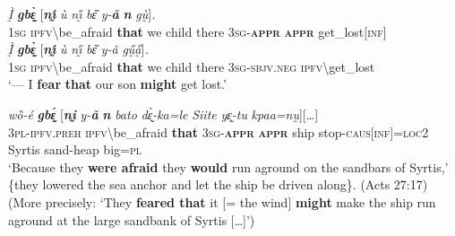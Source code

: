 \documentclass[output=paper,colorlinks,citecolor=brown
]{langscibook}
\begin{document}
\ea \label{ex:Fed37}
\ea \label{ex:Fed37a}
\gll \textit{Ḭ̀} \textit{\textbf{gbɛ̰̀}} \textup{[}\textit{\textbf{nı̰́}} \textit{ù} \textit{nı̰̋} \textit{bɛ̏} \textit{y-\textbf{ǎ}} \textit{\textbf{n{\ù}}} \textit{gṵ̀{\à}}\textup{]}\textit{.}\\
\textsc{1sg} \textsc{ipfv}\backslash be\_afraid \textbf{that} we child there \textsc{3sg-\textbf{appr}} \textsc{\textbf{appr}} get\_lost\textsc{[inf]} \\
\ex \label{ex:Fed37b}
\gll \textit{Ḭ̀} \textit{\textbf{gbɛ̰̀}} \textup{[}\textit{\textbf{nı̰́}} \textit{ù} \textit{nı̰̋} \textit{bɛ̏} \textit{y-ǎ} \textit{gṵ̋a̰̋}\textup{]}\textit{.} \\
\textsc{1sg} \textsc{ipfv}\backslash be\_afraid \textbf{that} we child there \textsc{3sg-sbjv.neg} \textsc{ipfv}\backslash get\_lost \\
 `--- I \textbf{fear} \textbf{that} our son \textbf{might} get lost.'
\z
\z


\ea \label{ex:Fed38}
\gll {\textup{[}\dots\textup{]}} \textit{wȍ-é} \textit{\textbf{gbɛ̰́}} \textup{[}\textit{\textbf{nḭ}} \textit{y-\textbf{ǎ}} \textit{\textbf{n{\ù}}} \textit{bato} \textit{dɛ̰̀-ka=le} \textit{Siite} \textit{yɛ̰-tu} \textit{kpaa=nṵ}\textup{]}{\textup{[}\dots\textup{]}}  \\
{} \textsc{3pl-ipfv.preh} \textsc{ipfv}\backslash be\_afraid \textbf{that} \textsc{3sg-\textbf{appr}} \textsc{\textbf{appr}} ship stop-\textsc{caus[inf]=loc2} Syrtis sand-heap big=\textsc{pl} \\
\glt `Because they \textbf{were afraid} they \textbf{would} run aground on the sandbars of Syrtis,' \{they lowered the sea anchor and let the ship be driven along\}. (Acts 27:17) \\
(More precisely: `They \textbf{feared that} it [= the wind] \textbf{might} make the ship run aground at the large sandbank of Syrtis [\dots]')
\z
\end{document}
